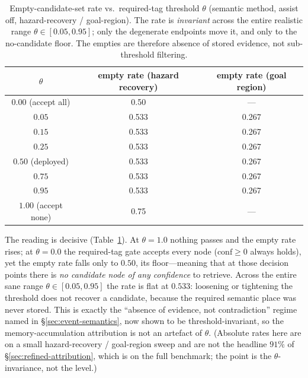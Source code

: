 \documentclass{article}
\begin{document}
\begin{table}[h]
\caption{Empty-candidate-set rate vs.\ required-tag threshold $\theta$ (semantic method, assist off, hazard-recovery / goal-region). The rate is \emph{invariant} across the entire realistic range $\theta\in[0.05,0.95]$; only the degenerate endpoints move it, and only to the no-candidate floor. The empties are therefore absence of stored evidence, not sub-threshold filtering.}
\label{tab:theta-robustness}
\centering
\small
\begin{tabular}{c c c}
\toprule
$\theta$ & empty rate (hazard recovery) & empty rate (goal region) \\
\midrule
$0.00$ (accept all) & 0.50 & --- \\
$0.05$ & 0.533 & 0.267 \\
$0.15$ & 0.533 & 0.267 \\
$0.25$ & 0.533 & 0.267 \\
$0.50$ (deployed) & 0.533 & 0.267 \\
$0.75$ & 0.533 & 0.267 \\
$0.95$ & 0.533 & 0.267 \\
$1.00$ (accept none) & 0.75 & --- \\
\bottomrule
\end{tabular}
\end{table}

The reading is decisive (Table~\ref{tab:theta-robustness}). At $\theta{=}1.0$ nothing passes and the empty rate rises; at $\theta{=}0.0$ the required-tag gate accepts every node ($\mathrm{conf}\ge 0$ always holds), yet the empty rate falls only to $0.50$, its floor---meaning that at those decision points there is \emph{no candidate node of any confidence} to retrieve. Across the entire sane range $\theta\in[0.05,0.95]$ the rate is flat at $0.533$: loosening or tightening the threshold does not recover a candidate, because the required semantic place was never stored. This is exactly the ``absence of evidence, not contradiction'' regime named in \S\ref{sec:event-semantics}, now shown to be threshold-invariant, so the memory-accumulation attribution is not an artefact of $\theta$. (Absolute rates here are on a small hazard-recovery / goal-region sweep and are not the headline $91\%$ of \S\ref{sec:refined-attribution}, which is on the full benchmark; the point is the $\theta$-invariance, not the level.)
\end{document}
